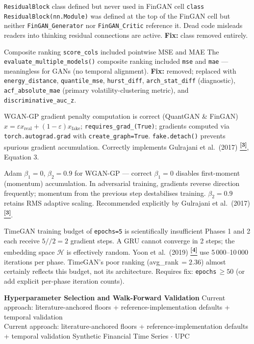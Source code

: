 \documentclass[10pt]{article}
\newcommand{\pagehead}[2]{%
  \begin{tcolorbox}[enhanced,arc=0pt,outer arc=0pt,boxrule=0pt,
    colback=Navy,colframe=Navy,
    top=5pt,bottom=5pt,left=8pt,right=8pt,
    before skip=0pt,after skip=10pt]
  {\color{white}\large\bfseries #1}%
  \ifx\relax#2\relax\else\\[1pt]{\color{blue!30!white}\small #2}\fi
  \hfill{\color{blue!20!white}\footnotesize Synthetic Financial Time Series $\cdot$ UPC}
  \end{tcolorbox}}
\newcommand{\tcite}[1]{%
  \hyperlink{R:#1}{\textsuperscript{\scriptsize\textbf{[#1]}}}}
\begin{document}
%
  {\texttt{ResidualBlock} class defined but never used in FinGAN cell}%
  {\texttt{class ResidualBlock(nn.Module)} was defined at the top of the FinGAN cell but neither \texttt{FinGAN\_Generator} nor \texttt{FinGAN\_Critic} reference it. Dead code misleads readers into thinking residual connections are active. \textbf{Fix:} class removed entirely.}

%
  {Composite ranking \texttt{score\_cols} included pointwise MSE and MAE}%
  {The \texttt{evaluate\_multiple\_models()} composite ranking included \texttt{mse} and \texttt{mae} --- meaningless for GANs (no temporal alignment). \textbf{Fix:} removed; replaced with \texttt{energy\_distance}, \texttt{quantile\_mse}, \texttt{hurst\_diff}, \texttt{arch\_stat\_diff} (diagnostic), \texttt{acf\_absolute\_mae} (primary volatility-clustering metric), and \texttt{discriminative\_auc\_z}.}

%
  {WGAN-GP gradient penalty computation is correct (QuantGAN \& FinGAN)}%
  {$\hat{x} = \varepsilon x_\text{real} + (1-\varepsilon)x_\text{fake}$; \texttt{requires\_grad\_(True)}; gradients computed via \texttt{torch.autograd.grad} with \texttt{create\_graph=True}. \texttt{fake.detach()} prevents spurious gradient accumulation. Correctly implements Gulrajani et al.\ (2017)\tcite{3}, Equation 3.}

%
  {Adam $\beta_1=0$, $\beta_2=0.9$ for WGAN-GP --- correct}%
  {$\beta_1=0$ disables first-moment (momentum) accumulation. In adversarial training, gradients reverse direction frequently; momentum from the previous step destabilises training. $\beta_2=0.9$ retains RMS adaptive scaling. Recommended explicitly by Gulrajani et al.\ (2017)\tcite{3}.}

%
  {TimeGAN training budget of \texttt{epochs=5} is scientifically insufficient}%
  {Phases 1 and 2 each receive $5//2=2$ gradient steps. A GRU cannot converge in 2 steps; the embedding space $\mathcal{H}$ is effectively random. Yoon et al.\ (2019)\tcite{4} use 5\,000--10\,000 iterations per phase. TimeGAN's poor ranking (avg\_rank\,$=2.36$) almost certainly reflects this budget, not its architecture. Requires fix: \texttt{epochs}\,$\geq 50$ (or add explicit per-phase iteration counts).}

\clearpage

\pagehead{Hyperparameter Selection and Walk-Forward Validation}
         {Current approach: literature-anchored floors + reference-implementation defaults + temporal validation}
\end{document}
